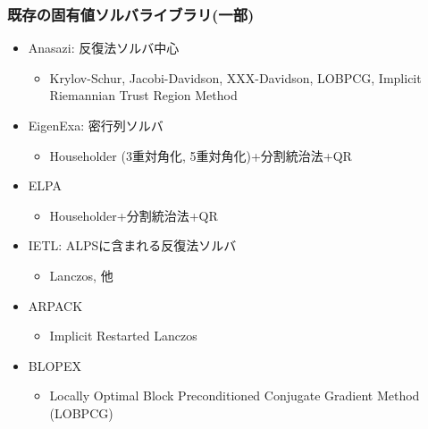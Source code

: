 \begin{frame}
  \frametitle{既存の固有値ソルバライブラリ(一部)}
  \begin{itemize}
  \item Anasazi: 反復法ソルバ中心
    \begin{itemize}
      \item Krylov-Schur, Jacobi-Davidson, XXX-Davidson, LOBPCG, Implicit Riemannian Trust Region Method
    \end{itemize}
  \item EigenExa: 密行列ソルバ
    \begin{itemize}
      \item Householder (3重対角化, 5重対角化)+分割統治法+QR
    \end{itemize}
  \item ELPA
    \begin{itemize}
      \item Householder+分割統治法+QR
    \end{itemize}
  \item IETL: ALPSに含まれる反復法ソルバ
    \begin{itemize}
      \item Lanczos, 他
    \end{itemize}
  \item ARPACK
    \begin{itemize}
      \item Implicit Restarted Lanczos
    \end{itemize}
  \item BLOPEX
    \begin{itemize}
    \item Locally Optimal Block Preconditioned Conjugate Gradient Method (LOBPCG)
    \end{itemize}
  \end{itemize}
\end{frame}

